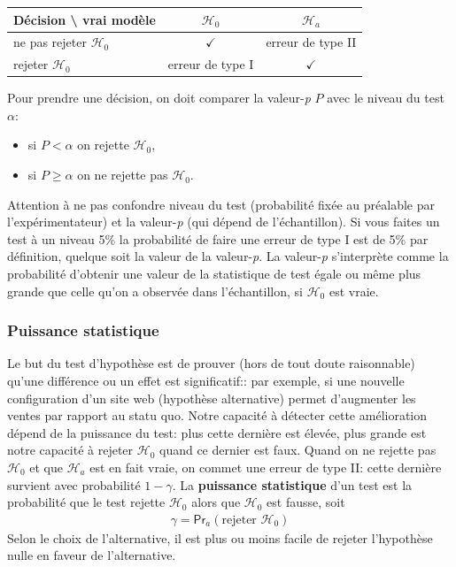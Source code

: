 \documentclass[
  11pt,
  letterpaper,
]{article}
\providecommand{\tightlist}{%
  \setlength{\itemsep}{0pt}\setlength{\parskip}{0pt}}
\theoremstyle{definition}
\theoremstyle{definition}
\theoremstyle{definition}
\theoremstyle{remark}
\begin{document}
\begin{longtable}[]{@{}lcc@{}}
\toprule
\textbf{Décision} \textbackslash{} \textbf{vrai modèle} & \(\mathscr{H}_0\) & \(\mathscr{H}_a\)\tabularnewline
\midrule
\endhead
ne pas rejeter \(\mathscr{H}_0\) & \(\checkmark\) & erreur de type II\tabularnewline
rejeter \(\mathscr{H}_0\) & erreur de type I & \(\checkmark\)\tabularnewline
\bottomrule
\end{longtable}

Pour prendre une décision, on doit comparer la valeur-\emph{p} \(P\) avec le niveau du test \(\alpha\):

\begin{itemize}
\tightlist
\item
  si \(P < \alpha\) on rejette \(\mathscr{H}_0\),
\item
  si \(P \geq \alpha\) on ne rejette pas \(\mathscr{H}_0\).
\end{itemize}

Attention à ne pas confondre niveau du test (probabilité fixée au préalable par l'expérimentateur) et la valeur-\emph{p} (qui dépend de l'échantillon). Si vous faites un test à un niveau 5\% la
probabilité de faire une erreur de type I est de 5\% par définition, quelque soit la
valeur de la valeur-\emph{p}. La valeur-\emph{p} s'interprète comme la probabilité d'obtenir une valeur de
la statistique de test égale ou même plus grande que celle qu'on a observée dans l'échantillon, si \(\mathscr{H}_0\) est vraie.

\hypertarget{puissance-statistique}{%
\subsubsection{Puissance statistique}\label{puissance-statistique}}

Le but du test d'hypothèse est de prouver (hors de tout doute raisonnable) qu'une différence ou un effet est significatif:: par exemple, si une nouvelle configuration d'un site web (hypothèse alternative) permet d'augmenter les ventes par rapport au statu quo. Notre capacité à détecter cette amélioration dépend de la puissance du test: plus cette dernière est élevée, plus grande est notre capacité à rejeter \(\mathscr{H}_0\) quand ce dernier est faux.
Quand on ne rejette pas \(\mathscr{H}_0\) et que \(\mathscr{H}_a\) est en fait vraie, on commet une erreur de type II: cette dernière survient avec probabilité \(1-\gamma\). La \textbf{puissance statistique} d'un test est la probabilité que le test rejette \(\mathscr{H}_0\) alors que \(\mathscr{H}_0\) est fausse, soit
\begin{align*}
\gamma = \mathsf{Pr}_a(\text{rejeter } \mathscr{H}_0)
\end{align*}
Selon le choix de l'alternative, il est plus ou moins facile de rejeter l'hypothèse nulle en faveur de l'alternative.
\end{document}
